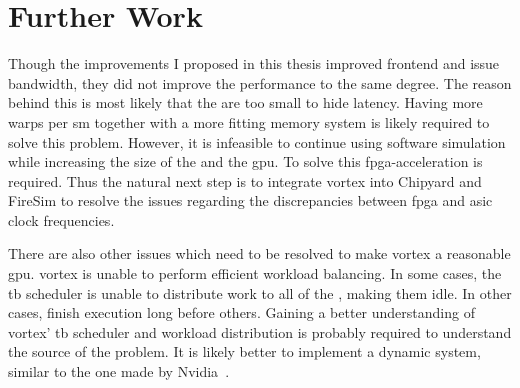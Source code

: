 \section{Further Work}

Though the improvements I proposed in this thesis improved frontend and issue bandwidth, they did not improve the performance to the same degree. The reason behind this is most likely that the  are too small to hide latency. Having more warps per \acrshort{sm} together with a more fitting memory system is likely required to solve this problem. However, it is infeasible to continue using software simulation while increasing the size of the  and the \acrshort{gpu}. To solve this \acrshort{fpga}-acceleration is required. Thus the natural next step is to integrate \Gls{vortex} into Chipyard and FireSim to resolve the issues regarding the discrepancies between \acrshort{fpga} and \acrshort{asic} clock frequencies.

There are also other issues which need to be resolved to make \Gls{vortex} a reasonable \acrshort{gpu}. \Gls{vortex} is unable to perform efficient workload balancing. In some cases, the \acrshort{tb} scheduler is unable to distribute work to all of the , making them idle. In other cases,  finish execution long before others. Gaining a better understanding of \Gls{vortex}' \acrshort{tb} scheduler and workload distribution is probably required to understand the source of the problem. It is likely better to implement a dynamic system, similar to the one made by Nvidia~\cite{CTA_scheduling}.  